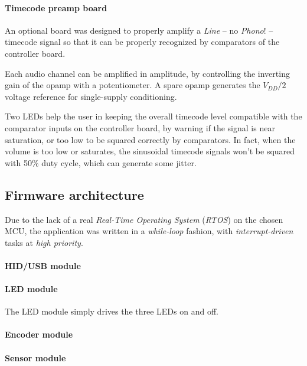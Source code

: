 \documentclass[a4paper,10pt]{article}
\begin{document}
\begin{multicols}{2}
\INSFIG


\paragraph{Timecode preamp board}
An optional board was designed to properly amplify a \emph{Line} -- no
\emph{Phono}! -- timecode signal so that it can be properly recognized by
comparators of the controller board.

Each audio channel can be amplified in amplitude, by controlling the inverting
gain of the opamp with a potentiometer. A spare opamp generates the $V_{DD}/2$
voltage reference for single-supply conditioning.

Two LEDs help the user in keeping the overall timecode level compatible with
the comparator inputs on the controller board, by warning if the signal is
near saturation, or too low to be squared correctly by comparators.
In fact, when the volume is too low or saturates, the sinusoidal timecode
signals won't be squared with 50\% duty cycle, which can generate some jitter.

\INSFIG


\subsection{Firmware architecture}

Due to the lack of a real \emph{Real-Time Operating System} (\emph{RTOS}) on
the chosen MCU, the application was written in a \emph{while-loop} fashion,
with \emph{interrupt-driven} tasks at \emph{high priority}.

\TODO


\paragraph{HID/USB module}
\TODO


\paragraph{LED module}
The LED module simply drives the three LEDs on and off.


\paragraph{Encoder module}
\TODO


\paragraph{Sensor module}
\TODO



\end{multicols}
\end{document}

